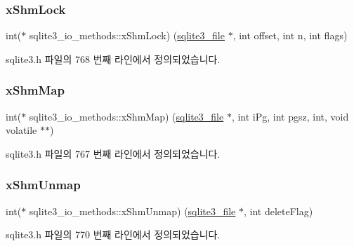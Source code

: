 \subsubsection{\texorpdfstring{x\+Shm\+Lock}{xShmLock}}
{\footnotesize\ttfamily int($\ast$ sqlite3\+\_\+io\+\_\+methods\+::x\+Shm\+Lock) (\hyperlink{structsqlite3__file}{sqlite3\+\_\+file} $\ast$, int offset, int n, int flags)}



sqlite3.\+h 파일의 768 번째 라인에서 정의되었습니다.

\mbox{\label{structsqlite3__io__methods_a2222efe012f210417f9881103014cdc5}} 
\subsubsection{\texorpdfstring{x\+Shm\+Map}{xShmMap}}
{\footnotesize\ttfamily int($\ast$ sqlite3\+\_\+io\+\_\+methods\+::x\+Shm\+Map) (\hyperlink{structsqlite3__file}{sqlite3\+\_\+file} $\ast$, int i\+Pg, int pgsz, int, void volatile $\ast$$\ast$)}



sqlite3.\+h 파일의 767 번째 라인에서 정의되었습니다.

\mbox{\label{structsqlite3__io__methods_a494ae8bbfe91c38598c73aaa18f1848f}} 
\subsubsection{\texorpdfstring{x\+Shm\+Unmap}{xShmUnmap}}
{\footnotesize\ttfamily int($\ast$ sqlite3\+\_\+io\+\_\+methods\+::x\+Shm\+Unmap) (\hyperlink{structsqlite3__file}{sqlite3\+\_\+file} $\ast$, int delete\+Flag)}



sqlite3.\+h 파일의 770 번째 라인에서 정의되었습니다.

\mbox{\label{structsqlite3__io__methods_ad4b78f6b0b475e621fe29fb1cc886437}} 
